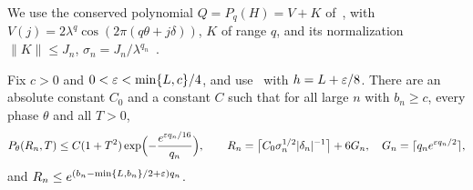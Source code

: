 We use the conserved polynomial $Q=P_q(H)=V+K$ of~\cite[Proposition~3.3]{DMamo}, with $V(j)=2\lambda^q\cos(2\pi(q\theta+j\delta))$, $K$ of range $q$, and its normalization $\|K\|\le J_n$, $\sigma_n=J_n/\lambda^{q_n}$~\cite[eq.~(10)]{DMamo}.

\begin{proposition}\label{prop:Camo}
Fix $c>0$ and $0<\varepsilon<\min\{L,c\}/4$, and use~\cite[eq.~(10)]{DMamo} with $h=L+\varepsilon/8$. There are an absolute constant $C_0$ and a constant $C$ such that for all large $n$ with $b_n\ge c$, every phase $\theta$ and all $T>0$,
\[
P_\theta(R_n,T)\le C(1+T^2)\exp\Bigl(-\frac{e^{\varepsilon q_n/16}}{q_n}\Bigr),\qquad R_n=\bigl\lceil C_0\sigma_n^{1/2}|\delta_n|^{-1}\bigr\rceil+6G_n,\quad G_n=\lceil q_ne^{\varepsilon q_n/2}\rceil,
\]
and $R_n\le e^{(b_n-\min\{L,b_n\}/2+\varepsilon)q_n}$.
\end{proposition}

